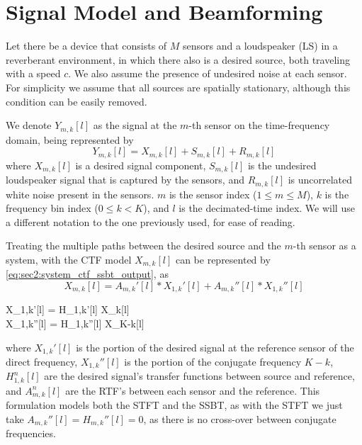 \section{Signal Model and Beamforming}
\label{sec:signal_model}

Let there be a device that consists of $M$ sensors and a loudspeaker (LS) in a reverberant environment, in which there also is a desired source, both traveling with a speed $c$. We also assume the presence of undesired noise at each sensor. For simplicity we assume that all sources are spatially stationary, although this condition can be easily removed.

We denote $Y_{m,k}[l]$ as the signal at the $m$-th sensor on the time-frequency domain, being represented by
\begin{equation}
	\label{eq:sec3:system_time-freq_domain_base}
	Y_{m,k}[l] = X_{m,k}[l] + S_{m,k}[l] + R_{m,k}[l]
\end{equation}
where $X_{m,k}[l]$ is a desired signal component, $S_{m,k}[l]$ is the undesired loudspeaker signal that is captured by the sensors, and $R_{m,k}[l]$ is uncorrelated white noise present in the sensors. $m$ is the sensor index ($1 \leq m \leq M$), $k$ is the frequency bin index ($0 \leq k < K$), and $l$ is the decimated-time index. We will use a different notation to the one previously used, for ease of reading.

Treating the multiple paths between the desired source and the $m$-th sensor as a system, with the CTF model $X_{m,k}[l]$ can be represented by \cref{eq:sec2:system_ctf_ssbt_output}, as
\begin{equation}
	\label{eq:sec3:def_ctf_ssbt}
	X_{m,k}[l] = A_{m,k}'[l] \ast X_{1,k}'[l] + A_{m,k}''[l] \ast X_{1,k}''[l]
\end{equation}\vspace*{-2em}
\begin{subgather}
	X_{1,k}'[l] = H_{1,k}'[l] \ast X_k[l] \\
	X_{1,k}''[l] = H_{1,k}''[l] \ast X_{K-k}[l]
\end{subgather}
where $X_{1,k}'[l]$ is the portion of the desired signal at the reference sensor of the direct frequency, $X_{1,k}''[l]$ is the portion of the conjugate frequency $K-k$, $H^n_{1,k}[l]$ are the desired signal's transfer functions between source and reference, and $A^n_{m,k}[l]$ are the RTF's between each sensor and the reference. This formulation models both the STFT and the SSBT, as with the STFT we just take $A_{m,k}''[l] = H_{m,k}''[l] = 0$, as there is no cross-over between conjugate frequencies.

